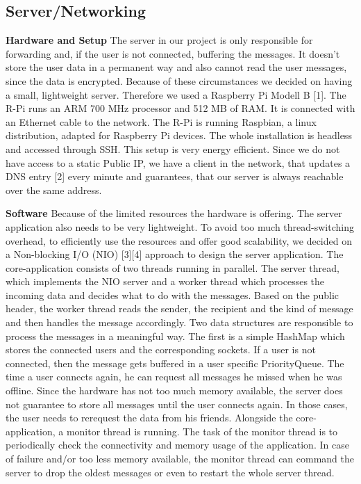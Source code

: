 \documentclass{report}
\begin{document}
\subsection{Server/Networking}
\textbf{Hardware and Setup}\newline
\indent The server in our project is only responsible for forwarding and, if the user is not connected, buffering the messages. It doesn't store the user data in a permanent way and also cannot read the user messages, since the data is encrypted. 
Because of these circumstances we decided on having a small, lightweight server. Therefore we used a Raspberry Pi Modell B [1]. The R-Pi runs an ARM 700 MHz processor and 512 MB of RAM. It is connected with an Ethernet cable to the network.
The R-Pi is running Raspbian, a linux distribution, adapted for Raspberry Pi devices. The whole installation is headless and accessed through SSH. This setup is very energy efficient. 
Since we do not have access to a static Public IP, we have a client in the network, that updates a DNS entry [2] every minute and guarantees, that our server is always reachable over the same address. 

\textbf{Software}\newline
\indent Because of the limited resources the hardware is offering. The server application also needs to be very lightweight. To avoid too much thread-switching overhead, to efficiently use the resources and offer good scalability, we decided on a Non-blocking I/O (NIO) [3][4] approach to design the server application. The core-application consists of two threads running in parallel. The server thread, which implements the NIO server and a worker thread which processes the incoming data and decides what to do with the messages. Based on the public header, the worker thread reads the sender, the recipient and the kind of message and then handles the message accordingly.
Two data structures are responsible to process the messages in a meaningful way. The first is a simple HashMap which stores the connected users and the corresponding sockets. If a user is not connected, then the message gets buffered in a user specific PriorityQueue. The time a user connects again, he can request all messages he missed when he was offline. Since the hardware has not too much memory available, the server does not guarantee to store all messages until the user connects again. In those cases, the user needs to rerequest the data from his friends.
Alongside the core-application, a monitor thread is running. The task of the monitor thread is to periodically check the connectivity and memory usage of the application. In case of failure and/or too less memory available, the monitor thread can command the server to drop the oldest messages or even to restart the whole server thread. 
\end{document}
